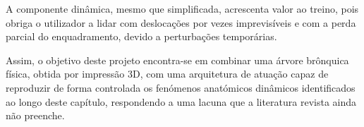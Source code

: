 A componente dinâmica, mesmo que simplificada, acrescenta valor ao treino, pois obriga o utilizador a lidar com deslocações por vezes imprevisíveis e com a perda parcial do enquadramento, devido a perturbações temporárias.

Assim, o objetivo deste projeto encontra-se em combinar uma árvore brônquica física, obtida por impressão 3D, com uma arquitetura de atuação capaz de reproduzir de forma controlada os fenómenos anatómicos dinâmicos identificados ao longo deste capítulo, respondendo a uma lacuna que a literatura revista ainda não preenche.
